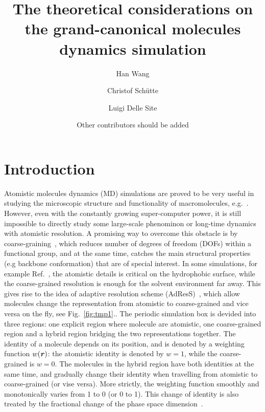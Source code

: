 \documentclass[aps,pre,preprint,unsortedaddress]{revtex4}
\renewcommand{\v}[1]{\textbf{\textit{#1}}}
\begin{document}
\title{The theoretical considerations on the grand-canonical molecules dynamics simulation}
\author{Han Wang}
\author{Christof Sch\"utte}
\author{Luigi Delle Site}
\author{Other contributors should be added}

\begin{abstract}
\end{abstract}

\maketitle

\section{Introduction}

Atomistic molecules dynamics (MD) simulations are proved to be very
useful in studying the microscopic structure and functionality of
macromolecules, e.g.~\cite{shaw2010atomic}. However, even with the
constantly growing super-computer power, it is still impossible to
directly study some large-scale phenominon or long-time dynamics with
atomistic resolution. A promising way to overcome this obstacle is by
coarse-graining~\cite{voth2009coarse, peter2008classical,
  peter2009multiscale}, which reduces number of degrees of freedom
(DOFs) within a functional group, and at the same time, catches the
main structural properties (e.g backbone conformation) that are of
special interest. In some simulations, for example
Ref.~\cite{lambeth2010communication}, the atomistic details is
critical on the hydrophobic surface, while the coarse-grained
resolution is enough for the solvent environment far away. This gives
rise to the idea of adaptive resolution scheme
(AdResS)~\cite{praprotnik2005adaptive, praprotnik2006adaptive}, which
allow molecules change the representation from atomistic to
coarse-grained and {vice versa} on the fly, see Fig.~\ref{fig:tmp1}..
The periodic simulation box is devided into three regions: one
explicit region where molecule are atomistic, one coarse-grained
region and a hybrid region bridging the two representations together.
The identity of a molecule depends on its position, and is denoted by
a weighting function $w(\v r)$: the atomistic identity is denoted by
$w=1$, while the coarse-grained is $w=0$.  The molecules in the hybrid
region have both identities at the same time, and gradually change
their identity when travelling from atomistic to coarse-grained (or
vise versa).  More strictly, the weighting function smoothly and
monotonically varies from 1 to 0 (or 0 to 1). This change of identity
is also treated by the fractional change of the phase space
dimension~\cite{praprotnik2007adaptive1, praprotnik2007fractional}.
\end{document}
